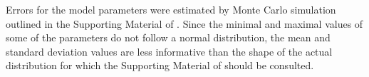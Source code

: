 Errors for the model parameters were estimated by Monte Carlo simulation
outlined in the Supporting Material of \PaperIII. Since the minimal and
maximal values of some of the parameters do not follow a normal
distribution, the mean and standard deviation values are less
informative than the shape of the actual distribution for which the Supporting Material of \PaperIII
should be consulted. 
%
